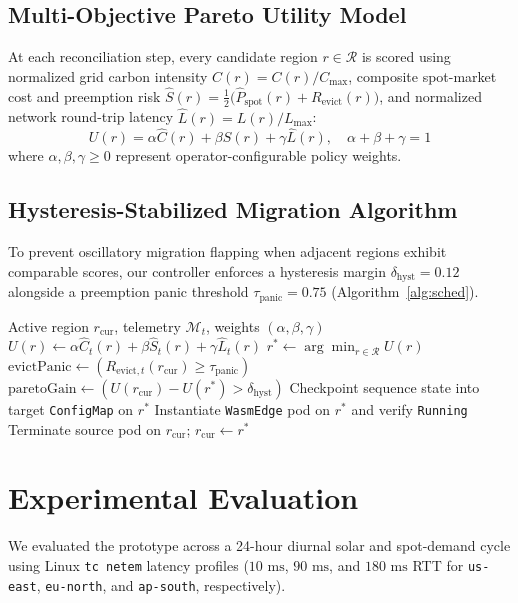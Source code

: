 \documentclass[conference]{IEEEtran}
\begin{document}
\subsection{Multi-Objective Pareto Utility Model}
At each reconciliation step, every candidate region $r \in \mathcal{R}$ is scored using normalized grid carbon intensity $\hat{C}(r) = C(r)/C_{\max}$, composite spot-market cost and preemption risk $\hat{S}(r) = \frac{1}{2}\big(\hat{P}_{\text{spot}}(r) + R_{\text{evict}}(r)\big)$, and normalized network round-trip latency $\hat{L}(r) = L(r)/L_{\max}$:
\begin{equation}
U(r) = \alpha \hat{C}(r) + \beta \hat{S}(r) + \gamma \hat{L}(r), \quad \alpha + \beta + \gamma = 1
\end{equation}
where $\alpha, \beta, \gamma \ge 0$ represent operator-configurable policy weights.

\subsection{Hysteresis-Stabilized Migration Algorithm}
To prevent oscillatory migration flapping when adjacent regions exhibit comparable scores, our controller enforces a hysteresis margin $\delta_{\text{hyst}} = 0.12$ alongside a preemption panic threshold $\tau_{\text{panic}} = 0.75$ (Algorithm~\ref{alg:sched}).

\begin{algorithm}[t]
\caption{Hysteresis-Stabilized Pareto Reconciliation}
\label{alg:sched}
\begin{algorithmic}[1]
\Require Active region $r_{\text{cur}}$, telemetry $\mathcal{M}_t$, weights $(\alpha,\beta,\gamma)$
    \State $U(r) \gets \alpha \hat{C}_t(r) + \beta \hat{S}_t(r) + \gamma \hat{L}_t(r)$
\EndFor
\State $r^* \gets \arg\min_{r \in \mathcal{R}} U(r)$
\State $\text{evictPanic} \gets (R_{\text{evict},t}(r_{\text{cur}}) \ge \tau_{\text{panic}})$
\State $\text{paretoGain} \gets (U(r_{\text{cur}}) - U(r^*) > \delta_{\text{hyst}})$
    \State Checkpoint sequence state into target \texttt{ConfigMap} on $r^*$
    \State Instantiate \texttt{WasmEdge} pod on $r^*$ and verify \texttt{Running}
    \State Terminate source pod on $r_{\text{cur}}$; $r_{\text{cur}} \gets r^*$
\EndIf
\end{algorithmic}
\end{algorithm}

\section{Experimental Evaluation}
We evaluated the prototype across a 24-hour diurnal solar and spot-demand cycle using Linux \texttt{tc netem} latency profiles ($10\text{ ms}$, $90\text{ ms}$, and $180\text{ ms}$ RTT for \texttt{us-east}, \texttt{eu-north}, and \texttt{ap-south}, respectively).
\end{document}
